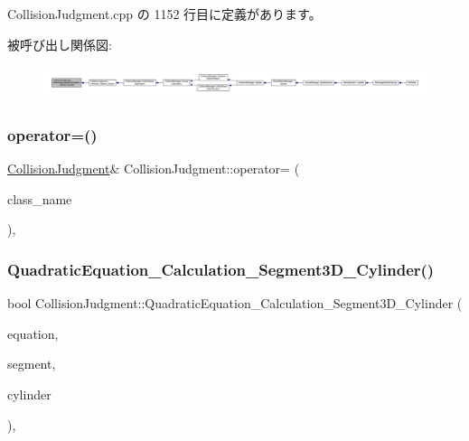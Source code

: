  Collision\+Judgment.\+cpp の 1152 行目に定義があります。

被呼び出し関係図\+:
\nopagebreak
\begin{figure}[H]
\begin{center}
\leavevmode
\includegraphics[width=350pt]{class_collision_judgment_a987df18ee059d409ebb64ea67c6e2777_icgraph}
\end{center}
\end{figure}
\mbox{\label{class_collision_judgment_a240135a0a865032c624fd0b364b1a400}} 
\subsubsection{\texorpdfstring{operator=()}{operator=()}}
{\footnotesize\ttfamily \mbox{\hyperlink{class_collision_judgment}{Collision\+Judgment}}\& Collision\+Judgment\+::operator= (\begin{DoxyParamCaption}\item[{const \mbox{\hyperlink{class_collision_judgment}{Collision\+Judgment}} \&}]{class\+\_\+name }\end{DoxyParamCaption})\hspace{0.3cm}{\ttfamily [private]}, {\ttfamily [delete]}}

\mbox{\label{class_collision_judgment_aa7d814d54f323c366de1d068440ded2b}} 
\subsubsection{\texorpdfstring{Quadratic\+Equation\+\_\+\+Calculation\+\_\+\+Segment3\+D\+\_\+\+Cylinder()}{QuadraticEquation\_Calculation\_Segment3D\_Cylinder()}}
{\footnotesize\ttfamily bool Collision\+Judgment\+::\+Quadratic\+Equation\+\_\+\+Calculation\+\_\+\+Segment3\+D\+\_\+\+Cylinder (\begin{DoxyParamCaption}\item[{\mbox{\hyperlink{class_quadratic_equation}{Quadratic\+Equation}} $\ast$}]{equation,  }\item[{const \mbox{\hyperlink{class_segment}{Segment}} $\ast$}]{segment,  }\item[{const \mbox{\hyperlink{class_cylinder}{Cylinder}} $\ast$}]{cylinder }\end{DoxyParamCaption})\hspace{0.3cm}{\ttfamily [static]}, {\ttfamily [private]}}



